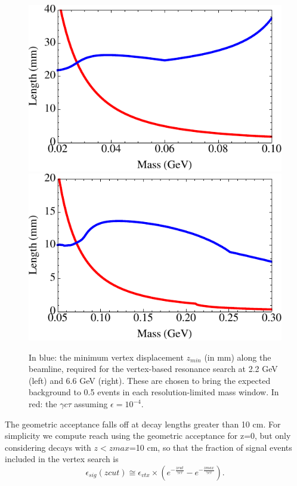 \begin{figure}
\includegraphics[scale=0.8]{reach/decay-lengths-2pt2.pdf}
\includegraphics[scale=0.8]{reach/decay-lengths-6pt6.pdf}
\caption{In blue:  the minimum vertex displacement $z_{min}$ (in mm) along the beamline, required for 
the vertex-based resonance search at 2.2 GeV (left) and 6.6 GeV (right).  These are chosen 
to bring the expected background to 0.5 events in each resolution-limited mass window. 
 In red:  the $\gamma c\tau$ assuming $\epsilon=10^{-4}$.}
\label{fig:vtxLength}
\end{figure} 


 The geometric acceptance falls off at  decay lengths greater than 10 cm.  
For simplicity we compute reach using the geometric acceptance for z=0, but only considering 
decays with $z<zmax$=10 cm, so that the fraction of signal events included in the vertex search is
\begin{equation}
\epsilon_{sig} (zcut) \cong \epsilon_{vtx} \times\left (e^{-{\frac{zcut} {\gamma c\tau}}} - e^{-{\frac{zmax} {\gamma c\tau}}}\right).
\end{equation}

